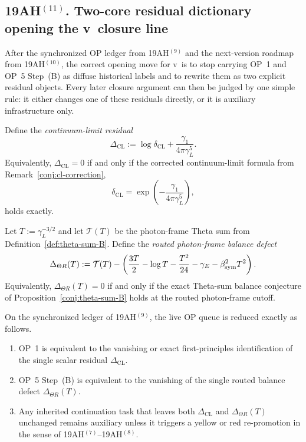 \subsection*{19AH$^{(11)}$. Two-core residual dictionary opening the v\docversion\ closure line}
After the synchronized OP ledger from 19AH$^{(9)}$ and the next-version roadmap from 19AH$^{(10)}$, the correct opening move for v\docversion\ is to stop carrying OP~1 and OP~5 Step~(B) as diffuse historical labels and to rewrite them as two explicit residual objects. Every later closure argument can then be judged by one simple rule: it either changes one of these residuals directly, or it is auxiliary infrastructure only.

\begin{definition}
\label{def:delta-cl-residual}
Define the \emph{continuum-limit residual}
\[
  \Delta_{\mathrm{CL}}
  :=
  \log \delta_{\mathrm{CL}} + \frac{\gamma_1}{4\pi\gamma_L^5}.
\]
Equivalently, \(\Delta_{\mathrm{CL}}=0\) if and only if the corrected continuum-limit formula from Remark~\ref{conj:cl-correction},
\[
  \delta_{\mathrm{CL}} = \exp\!\left(-\frac{\gamma_1}{4\pi\gamma_L^5}\right),
\]
holds exactly.
\end{definition}

\begin{definition}
\label{def:delta-theta-r-residual}
Let \(T:=\gamma_L^{-3/2}\) and let \(\mathcal T(T)\) be the photon-frame Theta sum from Definition~\ref{def:theta-sum-B}. Define the \emph{routed photon-frame balance defect}
\[
  \Delta_{\Theta R}(T)
  :=
  \mathcal T(T)
  - \left(\frac{3T}{2} - \log T - \frac{T^2}{24} - \gamma_E - \beta_{\mathrm{sym}}^2 T^2\right).
\]
Equivalently, \(\Delta_{\Theta R}(T)=0\) if and only if the exact Theta-sum balance conjecture of Proposition~\ref{conj:theta-sum-B} holds at the routed photon-frame cutoff.
\end{definition}

\begin{proposition}
\label{prop:two-core-residual-dictionary}
On the synchronized ledger of 19AH$^{(9)}$, the live OP queue is reduced exactly as follows.
\begin{enumerate}[leftmargin=2em]
  \item OP~1 is equivalent to the vanishing or exact first-principles identification of the single scalar residual \(\Delta_{\mathrm{CL}}\).
  \item OP~5 Step~(B) is equivalent to the vanishing of the single routed balance defect \(\Delta_{\Theta R}(T)\).
  \item Any inherited continuation task that leaves both \(\Delta_{\mathrm{CL}}\) and \(\Delta_{\Theta R}(T)\) unchanged remains auxiliary unless it triggers a yellow or red re-promotion in the sense of 19AH$^{(7)}$--19AH$^{(8)}$.
\end{enumerate}
\end{proposition}

